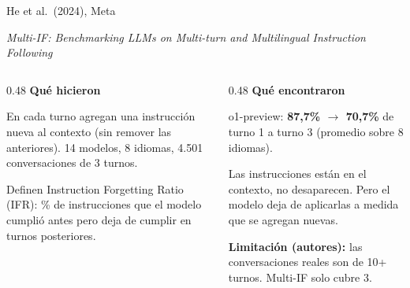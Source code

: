 \documentclass[aspectratio=169, 11pt]{beamer}
\begin{document}
\begin{frame}{He et al.\ (2024), Meta}

\textit{Multi-IF: Benchmarking LLMs on Multi-turn and Multilingual Instruction Following}

\vspace{0.6em}

\begin{columns}[T]
\begin{column}{0.48\textwidth}
\textbf{Qu\'e hicieron}

\vspace{0.3em}
\footnotesize
En cada turno agregan una instrucci\'on nueva al contexto (sin remover las anteriores). 14 modelos, 8 idiomas, 4.501 conversaciones de 3 turnos.

\vspace{0.5em}

Definen \alert{Instruction Forgetting Ratio (IFR)}: \% de instrucciones que el modelo cumpli\'o antes pero deja de cumplir en turnos posteriores.
\end{column}

\begin{column}{0.48\textwidth}
\textbf{Qu\'e encontraron}

\vspace{0.3em}
\footnotesize
o1-preview: \alert{\textbf{87{,}7\% $\to$ 70{,}7\%}} de turno 1 a turno 3 (promedio sobre 8 idiomas).

\vspace{0.6em}

Las instrucciones est\'an en el contexto, no desaparecen. Pero el modelo deja de aplicarlas a medida que se agregan nuevas.

\vspace{0.6em}

\textbf{Limitaci\'on (autores):} las conversaciones reales son de 10+ turnos. Multi-IF solo cubre 3.
\end{column}
\end{columns}

\end{frame}

\end{document}
